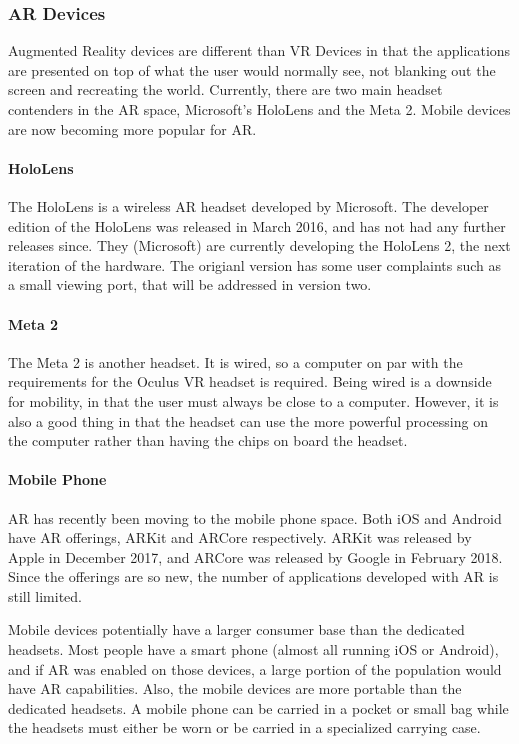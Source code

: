 
\subsubsection{AR Devices}

	Augmented Reality devices are different than VR Devices in that the applications are presented on top of what the user would normally see, not blanking out the screen and recreating the world.  Currently, there are two main headset contenders in the AR space, Microsoft's HoloLens and the Meta 2.  Mobile devices are now becoming more popular for AR.

	\paragraph{HoloLens}

		The HoloLens is a wireless AR headset developed by Microsoft.  The developer edition of the HoloLens was released in March 2016, and has not had any further releases since.  They (Microsoft) are currently developing the HoloLens 2, the next iteration of the hardware.  The origianl version has some user complaints such as a small viewing port, that will be addressed in version two.  

	\paragraph{Meta 2}

		The Meta 2 is another headset.  It is wired, so a computer on par with the requirements for the Oculus VR headset is required.  Being wired is a downside for mobility, in that the user must always be close to a computer.  However, it is also a good thing in that the headset can use the more powerful processing on the computer rather than having the chips on board the headset.

	\paragraph{Mobile Phone}

		AR has recently been moving to the mobile phone space.  Both iOS and Android have AR offerings, ARKit and ARCore respectively.  ARKit was released by Apple in December 2017, and ARCore was released by Google in February 2018.  Since the offerings are so new, the number of applications developed with AR is still limited.  
		
		Mobile devices potentially have a larger consumer base than the dedicated headsets.  Most people have a smart phone (almost all running iOS or Android), and if AR was enabled on those devices, a large portion of the population would have AR capabilities.  Also, the mobile devices are more portable than the dedicated headsets.  A mobile phone can be carried in a pocket or small bag while the headsets must either be worn or be carried in a specialized carrying case.  
		
